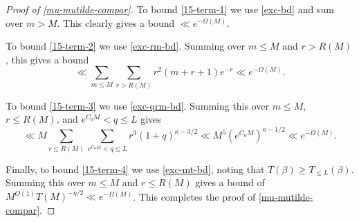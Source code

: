 \documentclass[11pt,reqno]{amsart}
\numberwithin{equation}{section}
\theoremstyle{definition}
\theoremstyle{remark}
\renewcommand{\le}{\leqslant}
\renewcommand{\ge}{\geqslant}
\begin{document}
\begin{proof}[Proof of \cref{mu-mutilde-compar}]
To bound \cref{15-term-1} we use \cref{exc-bd} and sum over $m > M$. This clearly gives a bound $\ll e^{-\Omega(M)}$.

To bound \cref{15-term-2} we use \cref{exc-rm-bd}. Summing over $m \le M$ and $r > R(M)$, this gives a bound
\[ \ll \sum_{m \le M} \sum_{r > R(M)} r^2 (m + r + 1) e^{-r} \ll e^{-\Omega(M)}.\] 

To bound \cref{15-term-3} we use \cref{exc-qrm-bd}. Summing this over $m \le M$, $r \le R(M)$, and $e^{C_0 M} < q \le L$ gives
\[ \ll M \sum_{r \le R(M)} \sum_{e^{C_0 M} < q \le L} r^3 (1 + q)^{\kappa - 3/2} \ll M^5 (e^{C_0 M})^{\kappa - 1/2} \ll e^{-\Omega(M)}.\]

Finally, to bound \cref{15-term-4} we use \cref{exc-mt-bd}, noting that $T(\beta) \ge T_{\le L}(\beta)$. Summing this over $m \le M$ and $r \le R(M)$ gives a bound of $M^{O(1)} T(M)^{-\eta/2} \ll e^{-\Omega(M)}$. This completes the proof of \cref{mu-mutilde-compar}.\end{proof}
\end{document}
